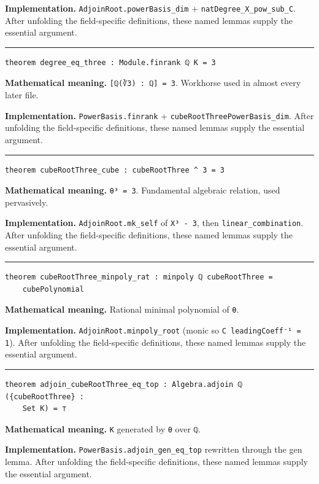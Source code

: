 \documentclass[UTF8,a4paper,11pt,fontset=fandol]{ctexart}
\theoremstyle{definition}
\newcommand{\statementsep}{\par\medskip\hrule\medskip}
\begin{document}
\noindent\textbf{Implementation.} \texttt{AdjoinRoot.\allowbreak{}powerBasis\_\allowbreak{}dim} + \texttt{natDegree\_\allowbreak{}X\_\allowbreak{}pow\_\allowbreak{}sub\_\allowbreak{}C}. After unfolding the field-specific definitions, these named lemmas supply the essential argument.\par
\statementsep
\begin{verbatim}
theorem degree_eq_three : Module.finrank ℚ K = 3
\end{verbatim}
\noindent\textbf{Mathematical meaning.} \texttt{[ℚ(∛3) : ℚ] = 3}. Workhorse used in almost every later file.\par
\noindent\textbf{Implementation.} \texttt{PowerBasis.\allowbreak{}finrank} + \texttt{cubeRootThreePowerBasis\_\allowbreak{}dim}. After unfolding the field-specific definitions, these named lemmas supply the essential argument.\par
\statementsep
\begin{verbatim}
theorem cubeRootThree_cube : cubeRootThree ^ 3 = 3
\end{verbatim}
\noindent\textbf{Mathematical meaning.} \texttt{θ³ = 3}. Fundamental algebraic relation, used pervasively.\par
\noindent\textbf{Implementation.} \texttt{AdjoinRoot.\allowbreak{}mk\_\allowbreak{}self} of \texttt{X³ - 3}, then \texttt{linear\_\allowbreak{}combination}. After unfolding the field-specific definitions, these named lemmas supply the essential argument.\par
\statementsep
\begin{verbatim}
theorem cubeRootThree_minpoly_rat : minpoly ℚ cubeRootThree =
    cubePolynomial
\end{verbatim}
\noindent\textbf{Mathematical meaning.} Rational minimal polynomial of \texttt{θ}.\par
\noindent\textbf{Implementation.} \texttt{AdjoinRoot.\allowbreak{}minpoly\_\allowbreak{}root} (monic so \texttt{C leadingCoeff⁻¹ = 1}). After unfolding the field-specific definitions, these named lemmas supply the essential argument.\par
\statementsep
\begin{verbatim}
theorem adjoin_cubeRootThree_eq_top : Algebra.adjoin ℚ ({cubeRootThree} :
    Set K) = ⊤
\end{verbatim}
\noindent\textbf{Mathematical meaning.} \texttt{K} generated by \texttt{θ} over \texttt{ℚ}.\par
\noindent\textbf{Implementation.} \texttt{PowerBasis.\allowbreak{}adjoin\_\allowbreak{}gen\_\allowbreak{}eq\_\allowbreak{}top} rewritten through the gen lemma. After unfolding the field-specific definitions, these named lemmas supply the essential argument.\par
\end{document}
